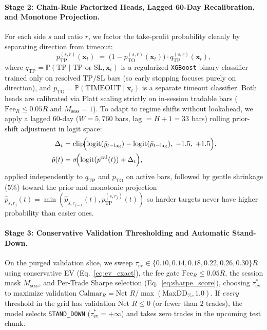 \documentclass{article}
\newcommand{\FeeR}{\mathrm{Fee}_R}
\newcommand{\TP}{\mathrm{TP}}
\newcommand{\SL}{\mathrm{SL}}
\newcommand{\logit}{\operatorname{logit}}
\begin{document}
\paragraph{Stage 2: Chain-Rule Factorized Heads, Lagged 60-Day Recalibration, and Monotone Projection.}
For each side $s$ and ratio $r$, we factor the take-profit probability cleanly by separating direction from timeout:
\begin{equation}
  p_{\TP}^{(s,r)}(\mathbf{x}_t) \;=\; \bigl(1 - p_{\mathrm{TO}}^{(s,r)}(\mathbf{x}_t)\bigr)\cdot q_{\TP}^{(s,r)}(\mathbf{x}_t),
  \label{eq:factorized}
\end{equation}
where $q_{\TP} = \mathbb{P}(\TP \mid \TP\text{ or }\SL, \mathbf{x}_t)$ is a regularized \texttt{XGBoost} binary classifier trained only on resolved $\TP/\SL$ bars (so early stopping focuses purely on direction), and $p_{\mathrm{TO}} = \mathbb{P}(\mathrm{TIMEOUT} \mid \mathbf{x}_t)$ is a separate timeout classifier. Both heads are calibrated via Platt scaling strictly on in-session tradable bars ($\FeeR \le 0.05R$ and $M_{\mathrm{sess}}=1$). To adapt to regime shifts without lookahead, we apply a lagged $60$-day ($W = 5{,}760$ bars, lag $= H+1 = 33$ bars) rolling prior-shift adjustment in logit space:
\begin{align}
  \Delta_t &= \operatorname{clip}\!\Bigl(\logit(\bar{y}_{t-\mathrm{lag}}) - \logit(\bar{p}_{t-\mathrm{lag}}),\; -1.5,\; +1.5\Bigr), \notag \\
  \tilde{p}(t) &= \sigma\!\Bigl(\logit(p^{\mathrm{cal}}(t)) + \Delta_t\Bigr),
  \label{eq:rolling_cal}
\end{align}
applied independently to $q_{\TP}$ and $p_{\mathrm{TO}}$ on active bars, followed by gentle shrinkage ($5\%$) toward the prior and monotonic projection $\hat{p}_{s, r_j}(t) = \min(\hat{p}_{s, r_{j-1}}(t), p_{\TP}^{(s,r_j)}(t))$ so harder targets never have higher probability than easier ones.

\paragraph{Stage 3: Conservative Validation Thresholding and Automatic Stand-Down.}
On the purged validation slice, we sweep $\tau_{\mathrm{ev}} \in \{0.10, 0.14, 0.18, 0.22, 0.26, 0.30\}R$ using conservative EV (Eq.~\eqref{eq:ev_exact}), the fee gate $\FeeR \le 0.05R$, the session mask $M_{\mathrm{sess}}$, and Per-Trade Sharpe selection (Eq.~\eqref{eq:sharpe_score}), choosing $\tau^*_{\mathrm{ev}}$ to maximize validation $\mathrm{Calmar}_R = \text{Net }R / \max(\mathrm{MaxDD}_\%, 1.0)$. If \emph{every} threshold in the grid has validation $\text{Net }R \le 0$ (or fewer than $2$ trades), the model selects \texttt{STAND\_DOWN} ($\tau^*_{\mathrm{ev}} = +\infty$) and takes zero trades in the upcoming test chunk.
\end{document}
